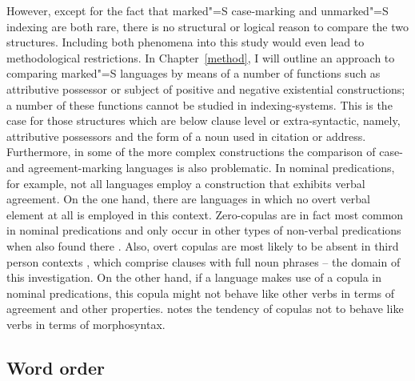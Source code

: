 However, except for the fact that marked"=S case-marking and unmarked"=S indexing are both rare, there is no structural or logical reason to compare the two structures. 
Including both phenomena into this study would even lead to methodological restrictions.
In Chapter~\ref{method}, I will outline an approach to comparing marked"=S languages by means of a number of functions such as attributive possessor or subject of positive and negative existential constructions; a number of these functions cannot be studied in indexing-systems.
This is the case for those structures which are below clause level or extra-syntactic, namely, attributive possessors and the form of a noun used in citation or address. 
Furthermore, in some of the more complex constructions the comparison of case- and agreement-marking languages is also problematic. 
In nominal predications, for example, not all languages employ a construction that exhibits verbal agreement. 
On the one hand, there are languages in which no overt verbal element at all is employed in this context. 
Zero-copulas are in fact most common in nominal predications and only occur in other types of non-verbal predications when also found there \citep[62--65]{Stassen:1997}. 
Also, overt copulas are most likely to be absent in third person contexts \citep[65]{Stassen:1997}, which comprise clauses with full noun phrases -- the domain of this investigation.
On the other hand, if a language makes use of a copula in nominal predications, this copula might
not behave like other verbs in terms of agreement and other properties. \citet{Pustet:2003} notes
the tendency of copulas not to behave like verbs in terms of morphosyntax.%
\enlargethispage{\baselineskip}

\subsection{Word order}\label{order}  

